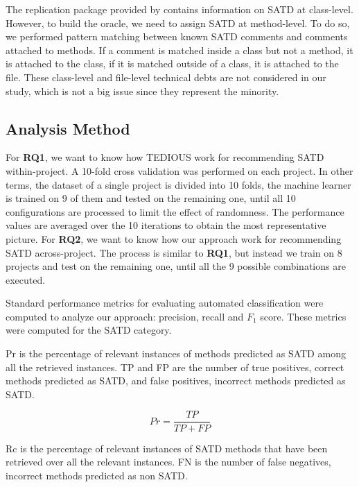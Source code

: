 The replication package provided by \citet{maldonado17} contains information on \ac{SATD} at class-level. However, to build the oracle, we need to assign \ac{SATD} at method-level. To do so, we performed pattern matching between known \ac{SATD} comments and comments attached to methods. If a comment is matched inside a class but not a method, it is attached to the class, if it is matched outside of a class, it is attached to the file. These class-level and file-level technical debts are not considered in our study, which is not a big issue since they represent the minority.

\subsection{Analysis Method}


For \textbf{RQ1}, we want to know how \ac{TEDIOUS} work for recommending \ac{SATD} within-project. A 10-fold cross validation was performed on each project. In other terms, the dataset of a single project is divided into 10 folds, the machine learner is trained on 9 of them and tested on the remaining one, until all 10 configurations are processed to limit the effect of randomness. The performance values are averaged over the 10 iterations to obtain the most representative picture. For \textbf{RQ2}, we want to know how our approach work for recommending \ac{SATD} across-project. The process is similar to \textbf{RQ1}, but instead we train on 8 projects and test on the remaining one, until all the 9 possible combinations are executed. \par 

Standard performance metrics for evaluating automated classification were computed to analyze our approach: precision, recall and $F_{1}$ score. These metrics were computed for the \ac{SATD} category. \par 

\ac{Pr} is the percentage of relevant instances of methods predicted as \ac{SATD} among all the retrieved instances. \ac{TP} and \ac{FP} are the number of true positives, correct methods predicted as \ac{SATD}, and false positives, incorrect methods predicted as \ac{SATD}.

\[
Pr=\frac{TP}{TP+FP}
\]

\ac{Rc} is the percentage of relevant instances of \ac{SATD} methods that have been retrieved over all the relevant instances. \ac{FN} is the number of false negatives, incorrect methods predicted as non \ac{SATD}.

